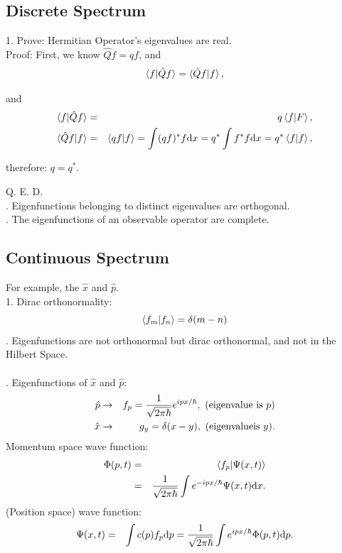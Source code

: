 \documentclass[12pt, 
]{article}
\begin{document}
\subsection{Discrete Spectrum}
1. Prove: Hermitian Operator's eigenvalues are real.\\
Proof: First, we know $\hat{Q}f=qf$, and 
\begin{eqnarray*}
	\braket{f|\hat{Q}f}=\braket{\hat{Q}f|f},
\end{eqnarray*}

and 
\begin{eqnarray*}
	\braket{f|\hat{Q}f}&=&q\braket{f|F},\\
	\braket{\hat{Q}f|f}&=&\braket{qf|f}=\int(qf)^*f{\rm d}x=q^*\int f^*f{\rm d}x=q^*\braket{f|f},
\end{eqnarray*}

therefore: $q=q^*$.

Q. E. D.
~\\

. Eigenfunctions belonging to distinct eigenvalues are orthogonal.~\\

. The eigenfunctions of an observable operator are complete.~\\

\subsection{Continuous Spectrum}
For example, the $\hat{x}$ and $\hat{p}$.\\
1. Dirac orthonormality:
\[
	\braket{f_m|f_n}=\delta(m-n)
\]
. Eigenfunctions are not orthonormal but dirac orthonormal, and not in the Hilbert Space.\\
~\\
. Eigenfunctions of $\hat{x}$ and $\hat{p}$:
\begin{eqnarray*}
	\hat{p}&\rightarrow&f_p=\frac{1}{\sqrt{2\pi\hbar}}e^{ipx/\hbar},~({\rm eigenvalue~is}~p)\\
	\hat{x}&\rightarrow&g_y=\delta(x-y),~({\rm eigenvalue is}~y).
\end{eqnarray*}
Momentum space wave function:
\begin{eqnarray*}
	\Phi(p,t)&=&\braket{f_p|\Psi(x,t)}\\
	&=&\frac{1}{\sqrt{2\pi\hbar}}\int e^{-ipx/\hbar}\Psi(x,t){\rm d}x.
\end{eqnarray*}
(Position space) wave function:
\begin{eqnarray*}
	\Psi(x,t)&=&\int c(p)f_p{\rm d}p=\frac{1}{\sqrt{2\pi\hbar}}\int e^{ipx/\hbar}\Phi(p,t){\rm d}p.
\end{eqnarray*}
\end{document}
